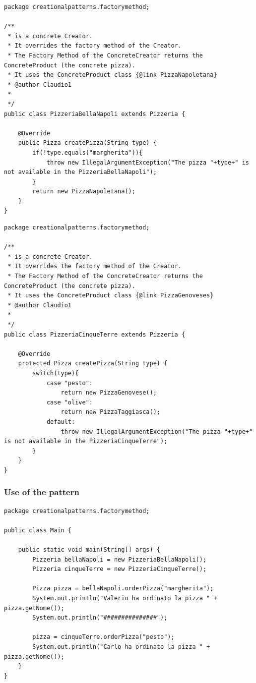 \documentclass{article}
\begin{document}
\begin{lstlisting}
package creationalpatterns.factorymethod;

/**
 * is a concrete Creator.
 * It overrides the factory method of the Creator. 
 * The Factory Method of the ConcreteCreator returns the ConcreteProduct (the concrete pizza). 
 * It uses the ConcreteProduct class {@link PizzaNapoletana} 
 * @author Claudio1
 *
 */
public class PizzeriaBellaNapoli extends Pizzeria {

	@Override
	public Pizza createPizza(String type) {
		if(!type.equals("margherita")){
			throw new IllegalArgumentException("The pizza "+type+" is not available in the PizzeriaBellaNapoli");
		}
		return new PizzaNapoletana();
	}
}
\end{lstlisting}

\begin{lstlisting}
package creationalpatterns.factorymethod;

/**
 * is a concrete Creator.
 * It overrides the factory method of the Creator. 
 * The Factory Method of the ConcreteCreator returns the ConcreteProduct (the concrete pizza). 
 * It uses the ConcreteProduct class {@link PizzaGenoveses} 
 * @author Claudio1
 *
 */
public class PizzeriaCinqueTerre extends Pizzeria {

	@Override
	protected Pizza createPizza(String type) {
		switch(type){
			case "pesto":
				return new PizzaGenovese();
			case "olive":
				return new PizzaTaggiasca();
			default: 
				throw new IllegalArgumentException("The pizza "+type+" is not available in the PizzeriaCinqueTerre");
		}
	}
}
\end{lstlisting}


\subsubsection{Use of the pattern}
\begin{lstlisting}
package creationalpatterns.factorymethod;

public class Main {

	public static void main(String[] args) {
		Pizzeria bellaNapoli = new PizzeriaBellaNapoli();
		Pizzeria cinqueTerre = new PizzeriaCinqueTerre();
		
		Pizza pizza = bellaNapoli.orderPizza("margherita");
		System.out.println("Valerio ha ordinato la pizza " + pizza.getNome());
		System.out.println("###############");
		
		pizza = cinqueTerre.orderPizza("pesto");
		System.out.println("Carlo ha ordinato la pizza " + pizza.getNome());
	}
}
\end{lstlisting}
\end{document}
